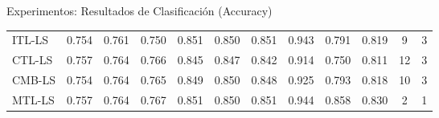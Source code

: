 \documentclass[aspectratio=43]{beamer}
\newcommand{\fmax}[1]{{\num[detect-weight=true,math-rm=\mathbf]{#1}}}
\newcommand{\fmod}[1]{\textsf{#1}}
\begin{document}
\begin{frame}{Experimentos: Resultados de Clasificación (Accuracy)}
\begin{table}[t]
{\begin{tabular}{ l*{8}{S[table-format=1.3]} c c c}
          \midrule
          \fmod{ITL-LS}    &          0.754 &           0.761 &                  0.750 &         \fmax{0.851} &          \fmax{0.850} &                 \fmax{0.851} &    0.943 &   0.791 & 0.819 &      9 & 3 \\
          \fmod{CTL-LS}    &          \fmax{0.757} &           \fmax{0.764} &                  0.766 &         0.845 &          0.847 &                 0.842 &    0.914 &   0.750 & 0.811 &     12 & 3 \\
          \fmod{CMB-LS} &          0.754 &           \fmax{0.764} &                  0.765 &         0.849 &          \fmax{0.850} &                 0.848 &    0.925 &   0.793 & 0.818 &     10 & 3 \\
          \fmod{MTL-LS}    &          \fmax{0.757} &           \fmax{0.764} &                  \fmax{0.767} &         \fmax{0.851} &          \fmax{0.850} &                 \fmax{0.851} &    \fmax{0.944} &   \fmax{0.858} & \fmax{0.830} &      2 & 1 \\
          \bottomrule  
        \end{tabular}}
        \end{table}
  
  \end{frame}
\end{document}
